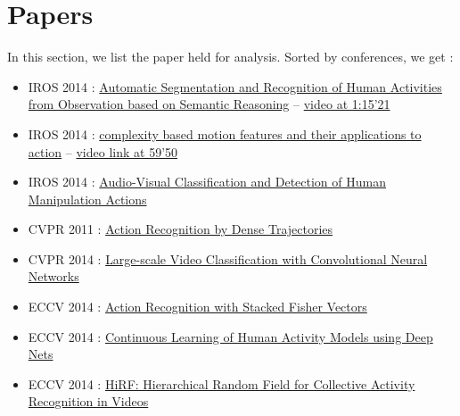 \documentclass[a4paper]{article}
\begin{document}
	\section{Papers}
		In this section, we list the paper held for analysis. Sorted by conferences, we get :
		\begin{itemize}
			\item IROS 2014 : \href{http://mediatum.ub.tum.de/doc/1244178/00196267309484.pdf}{Automatic Segmentation and Recognition of Human Activities from Observation based on Semantic Reasoning} -- \href{https://www.youtube.com/watch?v=oeH1oy5Htz4}{video at 1:15'21}
			\item IROS 2014 : \href{https://www.deepdyve.com/lp/institute-of-electrical-and-electronics-engineers/complexity-based-motion-features-and-their-applications-to-action-xmhZ06qZYP}{complexity based motion features and their applications to action} -- \href{https://www.youtube.com/watch?v=hW_AEQnSdCs}{video link at 59'50}
			\item IROS 2014 : \href{http://www.csc.kth.se/~hedvig/publications/iros_14.pdf}{Audio-Visual Classification and Detection of Human Manipulation Actions}

			\item CVPR 2011 : \href{https://hal.inria.fr/inria-00583818/document}{Action Recognition by Dense Trajectories}
			\item CVPR 2014 : \href{http://www.cv-foundation.org/openaccess/content_cvpr_2014/papers/Karpathy_Large-scale_Video_Classification_2014_CVPR_paper.pdf}{Large-scale Video Classification with Convolutional Neural Networks}
			\item ECCV 2014 : \href{http://pengxj.github.io/papers/PZQP_ECCV14_SFV.pdf}{Action Recognition with Stacked Fisher Vectors}
			\item ECCV 2014 : \href{http://www.ee.ucr.edu/~mhasan/papers/eccv2014HasanAmit.pdf}{Continuous Learning of Human Activity Models using Deep Nets}
			\item ECCV 2014 : \href{http://web.engr.oregonstate.edu/~sinisa/research/publications/eccv14_HiRF.pdf}{HiRF: Hierarchical Random Field for Collective Activity Recognition in Videos}



\end{itemize}
\end{document}
